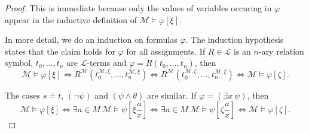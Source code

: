 \documentclass[a4paper, 11pt]{amsart}
\theoremstyle{remark}
\newcommand{\cL}{\mathcal L}
\newcommand{\cM}{\mathcal M}
\begin{document}
\begin{proof} 
This is immediate because only the values of variables occuring in $\varphi$ appear in the inductive definition of $\cM \models \varphi[\xi]$. 

In more detail, we do an induction on formulas $\varphi$. 
The induction hypothesis states that the claim holds for $\varphi$ for all assignments. 
If $R\in \cL$ is an $n$-ary relation symbol, $t_0,\dots,t_n$ are $\cL$-terms and $\varphi= R(t_0,\dots,t_n)$, then 
$$\cM \models \varphi[\xi] \Longleftrightarrow R^\cM (t_0^{\cM,\xi}, \dots, t_n^{\cM,\xi}) 
 \Longleftrightarrow R^\cM (t_0^{\cM,\zeta}, \dots, t_n^{\cM,\zeta}) \Longleftrightarrow \cM \models \varphi[\zeta].$$
 

The cases $s \doteq t$, $(\neg \psi)$ and $(\psi \wedge \theta)$ are similar. 
%
%
If $\varphi=(\exists x\ \psi)$, then 
$$ \cM \models \varphi[\xi] \Longleftrightarrow \exists a\in M\ \cM \models \psi[\xi \frac{a}{x}] \Longleftrightarrow \exists a\in M\ \cM \models \psi[\zeta \frac{a}{x}] \Longleftrightarrow \cM \models \varphi[\zeta].$$ 
\end{proof}
\end{document}
